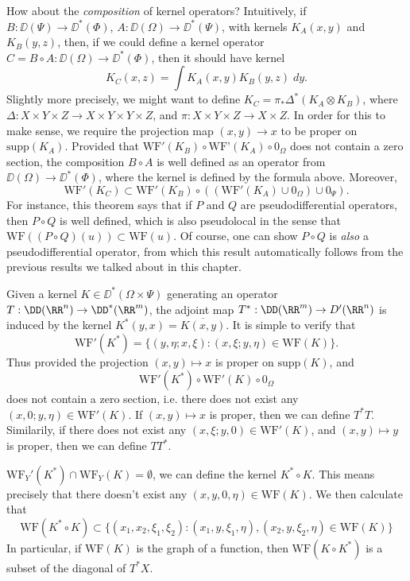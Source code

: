 How about the \emph{composition} of kernel operators? Intuitively, if $B: \DD(\Psi) \to \DD^*(\Phi)$, $A: \DD(\Omega) \to \DD^*(\Psi)$, with kernels $K_A(x,y)$ and $K_B(y,z)$, then, if we could define a kernel operator $C = B \circ A: \DD(\Omega) \to \DD^*(\Phi)$, then it should have kernel
%
\[ K_C(x,z) = \int K_A(x,y) K_B(y,z)\; dy. \]
%
Slightly more precisely, we might want to define $K_C = \pi_* \Delta^*(K_A \otimes K_B)$, where $\Delta: X \times Y \times Z \to X \times Y \times Y \times Z$, and $\pi: X \times Y \times Z \to X \times Z$. In order for this to make sense, we require the projection map $(x,y) \to x$ to be proper on $\text{supp}(K_A)$. Provided that $\text{WF}'(K_B) \circ \text{WF'}(K_A) \circ 0_\Omega$ does not contain a zero section, the composition $B \circ A$ is well defined as an operator from $\DD(\Omega) \to \DD^*(\Phi)$, where the kernel is defined by the formula above. Moreover,
%
\[ \text{WF}'(K_C) \subset \text{WF}'(K_B) \circ ((\text{WF}'(K_A) \cup 0_\Omega) \cup 0_\Psi). \]
%
For instance, this theorem says that if $P$ and $Q$ are pseudodifferential operators, then $P \circ Q$ is well defined, which is also pseudolocal in the sense that $\text{WF}((P \circ Q)(u)) \subset \text{WF}(u)$. Of course, one can show $P \circ Q$ is \emph{also} a pseudodifferential operator, from which this result automatically follows from the previous results we talked about in this chapter.

\begin{example}
    Given a kernel $K \in \DD^*(\Omega \times \Psi)$ generating an operator $T: \DD(\RR^n) \to \DD^*(\RR^m)$, the adjoint map $T^*: \DD(\RR^m) \to D'(\RR^n)$ is induced by the kernel $K^*(y,x) = \overline{K(x,y)}$. It is simple to verify that
    \[ \text{WF}'(K^*) = \{ (y,\eta;x,\xi) : (x,\xi;y,\eta) \in \text{WF}(K) \}. \]
    Thus provided the projection $(x,y) \mapsto x$ is proper on $\text{supp}(K)$, and
    \[ \text{WF}'(K^*) \circ \text{WF}'(K) \circ 0_\Omega \]
    does not contain a zero section, i.e. there does not exist any $(x,0;y,\eta) \in \text{WF}'(K)$. If $(x,y) \mapsto x$ is proper, then we can define $T^* T$. Similarily, if there does not exist any $(x,\xi;y,0) \in \text{WF}'(K)$, and $(x,y) \mapsto y$ is proper, then we can define $T T^*$.

    $\text{WF}_Y'(K^*) \cap \text{WF}_Y(K) = \emptyset$, we can define the kernel $K^* \circ K$. This means precisely that there doesn't exist any $(x,y,0,\eta) \in \text{WF}(K)$. We then calculate that
    \[ \text{WF}(K^* \circ K) \subset \{ (x_1,x_2,\xi_1,\xi_2) : (x_1,y,\xi_1,\eta), (x_2,y,\xi_2,\eta) \in \text{WF}(K) \} \]
    In particular, if $\text{WF}(K)$ is the graph of a function, then $\text{WF}(K \circ K^*)$ is a subset of the diagonal of $T^* X$.
\end{example}



